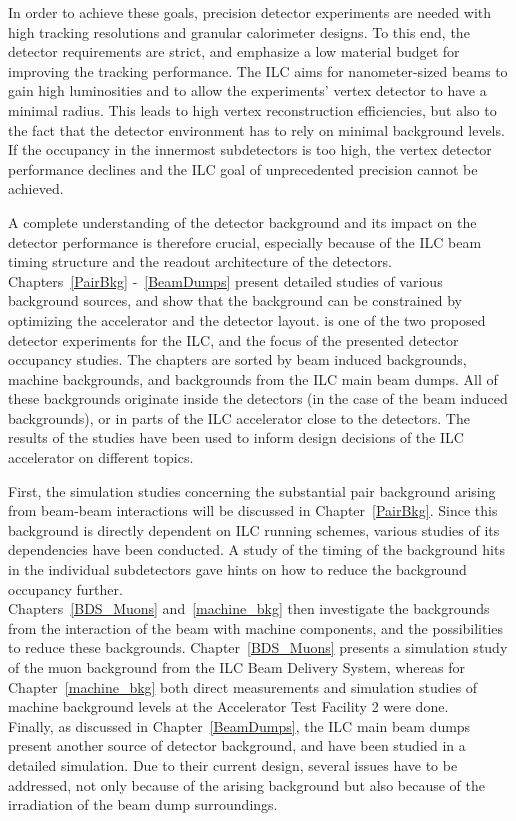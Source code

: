 In order to achieve these goals, precision detector experiments are needed with high tracking resolutions and granular calorimeter designs.
To this end, the detector requirements are strict, and emphasize a low material budget for improving the tracking performance.
The ILC aims for nanometer-sized beams to gain high luminosities and to allow the experiments' vertex detector to have a minimal radius.
This leads to high vertex reconstruction efficiencies, but also to the fact that the detector environment has to rely on minimal background levels.
If the occupancy in the innermost subdetectors is too high, the vertex detector performance declines and the ILC goal of unprecedented precision cannot be achieved.

A complete understanding of the detector background and its impact on the detector performance is therefore crucial, especially because of the ILC beam timing structure and the readout architecture of the detectors.
Chapters~\ref{PairBkg} -~\ref{BeamDumps} present detailed studies of various background sources, and show that the background can be constrained by optimizing the accelerator and the \sid detector layout.
\sid is one of the two proposed detector experiments for the ILC, and the focus of the presented detector occupancy studies.
The chapters are sorted by beam induced backgrounds, machine backgrounds, and backgrounds from the ILC main beam dumps.
All of these backgrounds originate inside the detectors (in the case of the beam induced backgrounds), or in parts of the ILC accelerator close to the detectors.
The results of the studies have been used to inform design decisions of the ILC accelerator on different topics.

First, the simulation studies concerning the substantial \positron\electron pair background arising from beam-beam interactions will be discussed in Chapter~\ref{PairBkg}.
Since this background is directly dependent on ILC running schemes, various studies of its dependencies have been conducted.
A study of the timing of the background hits in the individual \sid subdetectors gave hints on how to reduce the background occupancy further.
\\Chapters~\ref{BDS_Muons} and~\ref{machine_bkg} then investigate the backgrounds from the interaction of the beam with machine components, and the possibilities to reduce these backgrounds.
Chapter~\ref{BDS_Muons} presents a simulation study of the muon background from the ILC Beam Delivery System, whereas for Chapter~\ref{machine_bkg} both direct measurements and simulation studies of machine background levels at the Accelerator Test Facility 2 were done.
\\Finally, as discussed in Chapter~\ref{BeamDumps}, the ILC main beam dumps present another source of detector background, and have been studied in a detailed simulation.
Due to their current design, several issues have to be addressed, not only because of the arising background but also because of the irradiation of the beam dump surroundings.

